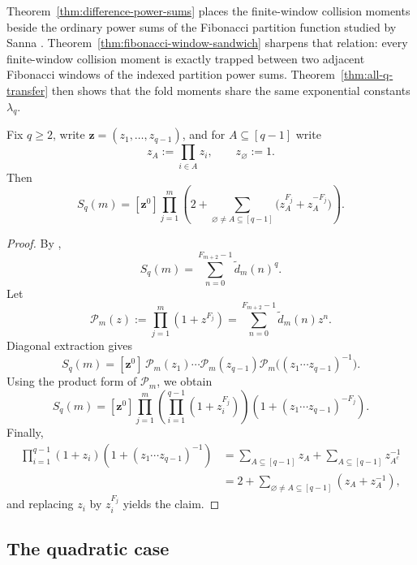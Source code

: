 \begin{remark}
\label{rem:sanna-relation}
Theorem~\ref{thm:difference-power-sums} places the finite-window collision
moments beside the ordinary power sums of the Fibonacci partition function
studied by Sanna \cite{Sanna2025}.  Theorem~\ref{thm:fibonacci-window-sandwich}
sharpens that relation: every finite-window collision moment is exactly trapped
between two adjacent Fibonacci windows of the indexed partition power sums.
Theorem~\ref{thm:all-q-transfer} then shows that the fold moments share the
same exponential constants \(\lambda_q\).
\end{remark}

\begin{corollary}
\label{cor:multivariate-moment-kernel}
Fix \(q\ge 2\), write \(\mathbf z=(z_1,\dots,z_{q-1})\), and for
\(A\subseteq [q-1]\) write
\[
  z_A:=\prod_{i\in A}z_i,
  \qquad
  z_\varnothing:=1.
\]
Then
\[
  S_q(m)
  =
  [\mathbf z^0]
  \prod_{j=1}^m
  \left(
    2+\sum_{\varnothing\neq A\subseteq [q-1]}
    \bigl(z_A^{F_j}+z_A^{-F_j}\bigr)
  \right).
\]
\end{corollary}

\begin{proof}
By ,
\[
  S_q(m)
  =
  \sum_{n=0}^{F_{m+2}-1}\widetilde d_m(n)^q.
\]
Let
\[
  \mathcal P_m(z):=\prod_{j=1}^m(1+z^{F_j})
  =
  \sum_{n=0}^{F_{m+2}-1}\widetilde d_m(n)z^n.
\]
Diagonal extraction gives
\[
  S_q(m)
  =
  [\mathbf z^0]\,
  \mathcal P_m(z_1)\cdots \mathcal P_m(z_{q-1})
  \mathcal P_m\bigl((z_1\cdots z_{q-1})^{-1}\bigr).
\]
Using the product form of \(\mathcal P_m\), we obtain
\[
  S_q(m)
  =
  [\mathbf z^0]
  \prod_{j=1}^m
  \left(
    \prod_{i=1}^{q-1}(1+z_i^{F_j})
  \right)
  \left(
    1+(z_1\cdots z_{q-1})^{-F_j}
  \right).
\]
Finally,
\begin{align*}
  \prod_{i=1}^{q-1}(1+z_i)\left(1+(z_1\cdots z_{q-1})^{-1}\right)
  &=
  \sum_{A\subseteq [q-1]}z_A
  +
  \sum_{A\subseteq [q-1]}z_{A^c}^{-1} \\
  &=
  2+\sum_{\varnothing\neq A\subseteq [q-1]}(z_A+z_A^{-1}),
\end{align*}
and replacing \(z_i\) by \(z_i^{F_j}\) yields the claim.
\end{proof}

\subsection{The quadratic case}

